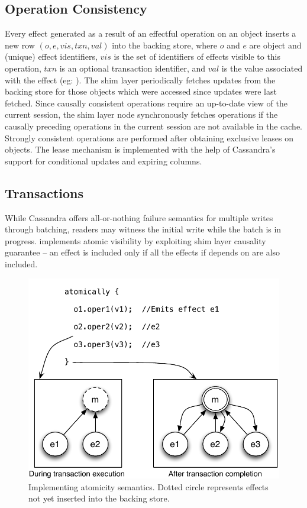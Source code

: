 \subsection{Operation Consistency}

Every effect generated as a result of an effectful operation on an object
inserts a new row $(o,\allowbreak e,\allowbreak vis,\allowbreak txn,val)$ into the backing store, where $o$ and $e$
are object and (unique) effect identifiers, $vis$ is the set of identifiers of
effects visible to this operation, $txn$ is an optional transaction identifier,
and $val$ is the value associated with the effect (eg: ). The
shim layer periodically fetches updates from the backing store for those objects
which were accessed since updates were last fetched. Since causally consistent
operations require an up-to-date view of the current session, the shim layer
node synchronously fetches operations if the causally preceding operations in
the current session are not available in the cache.  Strongly consistent
operations are performed after obtaining exclusive leases on objects. The lease
mechanism is implemented with the help of Cassandra's support for conditional
updates and expiring columns.

\subsection{Transactions}

While Cassandra offers all-or-nothing failure semantics for multiple writes
through batching, readers may witness the initial write while the batch is in
progress. \quelea implements atomic visibility by exploiting shim layer causality
guarantee -- an effect is included only if all the effects if depends on are
also included.

\begin{figure}[t]
\begin{center}
\includegraphics[width=0.7\columnwidth]{Figures/AtomicityImpl}
\end{center}
\caption{Implementing atomicity semantics. Dotted circle represents effects not yet inserted into the backing store.}
\label{fig:atomicity_impl}
\end{figure}

